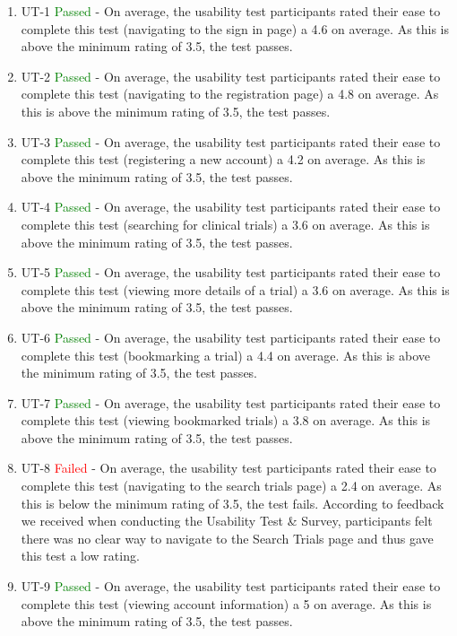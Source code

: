 \documentclass[12pt, titlepage]{article}
\begin{document}
\begin{enumerate}
  \item UT-1 \textcolor{green}{Passed} - On average, the usability test participants rated their ease to complete this test (navigating to the sign in page) a 4.6 on average. As this is above the minimum rating of 3.5, the test passes.
  \item UT-2 \textcolor{green}{Passed} - On average, the usability test participants rated their ease to complete this test (navigating to the registration page) a 4.8 on average. As this is above the minimum rating of 3.5, the test passes.
  \item UT-3 \textcolor{green}{Passed} - On average, the usability test participants rated their ease to complete this test (registering a new account) a 4.2 on average. As this is above the minimum rating of 3.5, the test passes.
  \item UT-4 \textcolor{green}{Passed} - On average, the usability test participants rated their ease to complete this test (searching for clinical trials) a 3.6 on average. As this is above the minimum rating of 3.5, the test passes.
  \item UT-5 \textcolor{green}{Passed} - On average, the usability test participants rated their ease to complete this test (viewing more details of a trial) a 3.6 on average. As this is above the minimum rating of 3.5, the test passes.
  \item UT-6 \textcolor{green}{Passed} - On average, the usability test participants rated their ease to complete this test (bookmarking a trial) a 4.4 on average. As this is above the minimum rating of 3.5, the test passes.
  \item UT-7 \textcolor{green}{Passed} - On average, the usability test participants rated their ease to complete this test (viewing bookmarked trials) a 3.8 on average. As this is above the minimum rating of 3.5, the test passes.
  \item UT-8 \textcolor{red}{Failed} - On average, the usability test participants rated their ease to complete this test (navigating to the search trials page) a 2.4 on average. As this is below the minimum rating of 3.5, the test fails. According to feedback we received when conducting the Usability Test \& Survey, participants felt there was no clear way to navigate to the Search Trials page and thus gave this test a low rating.
  \item UT-9 \textcolor{green}{Passed} - On average, the usability test participants rated their ease to complete this test (viewing account information) a 5 on average. As this is above the minimum rating of 3.5, the test passes.

\end{enumerate}
\end{document}
